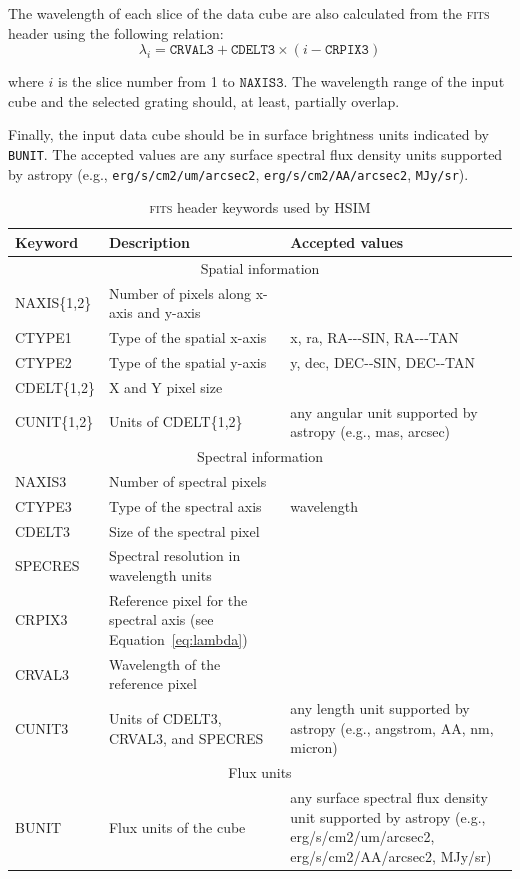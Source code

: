 \documentclass[12pt]{report}
\begin{document}
The wavelength of each slice of the data cube are also calculated from the \textsc{fits} header using the following relation:
\begin{equation}\label{eq:lambda}
\lambda_i = \texttt{CRVAL3} + \texttt{CDELT3} \times (i - \texttt{CRPIX3})
\end{equation}

where $i$ is the slice number from 1 to $\texttt{NAXIS3}$. The wavelength range of the input cube and the selected grating should, at least, partially overlap.

Finally, the input data cube should be in surface brightness units indicated by \texttt{BUNIT}. The accepted values are any surface spectral flux density units supported by astropy (e.g., \texttt{erg/s/cm2/um/arcsec2}, \texttt{erg/s/cm2/AA/arcsec2}, \texttt{MJy/sr}).


\begin{table}[h]
\footnotesize
\centering
\caption{\textsc{fits} header keywords used by HSIM}
\label{tab:fits_header}
\begin{tabular}{lp{75mm}p{50mm}}
\hline
Keyword & Description & Accepted values \\
\hline
\multicolumn{3}{c}{Spatial information}\\
\hline
NAXIS\{1,2\} & Number of pixels along x-axis and y-axis\\
CTYPE1 & Type of the spatial x-axis & x, ra, RA-{}-{}-SIN, RA-{}-{}-TAN \\
CTYPE2 & Type of the spatial y-axis & y, dec, DEC-{}-SIN, DEC-{}-TAN \\
CDELT\{1,2\} & X and Y pixel size \\
CUNIT\{1,2\} & Units of CDELT\{1,2\} & any angular unit supported by astropy (e.g., mas, arcsec)\\
\hline
\multicolumn{3}{c}{Spectral information}\\
\hline
NAXIS3 & Number of spectral pixels \\
CTYPE3 & Type of the spectral axis & wavelength \\
CDELT3 & Size of the spectral pixel \\
SPECRES & Spectral resolution in wavelength units &  \\
CRPIX3 & Reference pixel for the spectral axis (see Equation~\ref{eq:lambda}) \\
CRVAL3 & Wavelength of the reference pixel\\
CUNIT3 & Units of CDELT3, CRVAL3, and SPECRES & any length unit supported by astropy (e.g., angstrom, AA, nm, micron) \\
\hline
\multicolumn{3}{c}{Flux units}\\
\hline
BUNIT & Flux units of the cube & any surface spectral flux density unit supported by astropy (e.g., erg/s/cm2/um/arcsec2, erg/s/cm2/AA/arcsec2, MJy/sr) \\
\hline
\end{tabular}
\end{table}
\end{document}
